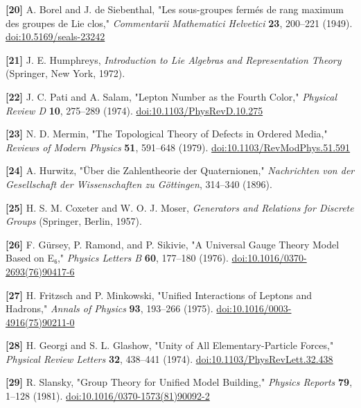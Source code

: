 \documentclass[a4paper,11pt]{article}
\begin{document}
\label{ref20}
\noindent \textbf{[20]} A. Borel and J. de Siebenthal, "Les sous-groupes fermés de rang maximum des groupes de Lie clos," \textit{Commentarii Mathematici Helvetici} \textbf{23}, 200–221 (1949). \href{https://doi.org/10.5169/seals-23242}{doi:10.5169/seals-23242}


\label{ref21}
\noindent \textbf{[21]} J. E. Humphreys, \textit{Introduction to Lie Algebras and Representation Theory} (Springer, New York, 1972).


\label{ref22}
\noindent \textbf{[22]} J. C. Pati and A. Salam, "Lepton Number as the Fourth Color," \textit{Physical Review D} \textbf{10}, 275–289 (1974). \href{https://doi.org/10.1103/PhysRevD.10.275}{doi:10.1103/PhysRevD.10.275}


\label{ref23}
\noindent \textbf{[23]} N. D. Mermin, "The Topological Theory of Defects in Ordered Media," \textit{Reviews of Modern Physics} \textbf{51}, 591–648 (1979). \href{https://doi.org/10.1103/RevModPhys.51.591}{doi:10.1103/RevModPhys.51.591}


\label{ref24}
\noindent \textbf{[24]} A. Hurwitz, "Über die Zahlentheorie der Quaternionen," \textit{Nachrichten von der Gesellschaft der Wissenschaften zu Göttingen}, 314–340 (1896).


\label{ref25}
\noindent \textbf{[25]} H. S. M. Coxeter and W. O. J. Moser, \textit{Generators and Relations for Discrete Groups} (Springer, Berlin, 1957).


\label{ref26}
\noindent \textbf{[26]} F. Gürsey, P. Ramond, and P. Sikivie, "A Universal Gauge Theory Model Based on E₆," \textit{Physics Letters B} \textbf{60}, 177–180 (1976). \href{https://doi.org/10.1016/0370-2693(76)90417-6}{doi:10.1016/0370-2693(76)90417-6}


\label{ref27}
\noindent \textbf{[27]} H. Fritzsch and P. Minkowski, "Unified Interactions of Leptons and Hadrons," \textit{Annals of Physics} \textbf{93}, 193–266 (1975). \href{https://doi.org/10.1016/0003-4916(75)90211-0}{doi:10.1016/0003-4916(75)90211-0}


\label{ref28}
\noindent \textbf{[28]} H. Georgi and S. L. Glashow, "Unity of All Elementary-Particle Forces," \textit{Physical Review Letters} \textbf{32}, 438–441 (1974). \href{https://doi.org/10.1103/PhysRevLett.32.438}{doi:10.1103/PhysRevLett.32.438}


\label{ref29}
\noindent \textbf{[29]} R. Slansky, "Group Theory for Unified Model Building," \textit{Physics Reports} \textbf{79}, 1–128 (1981). \href{https://doi.org/10.1016/0370-1573(81)90092-2}{doi:10.1016/0370-1573(81)90092-2}
\end{document}
